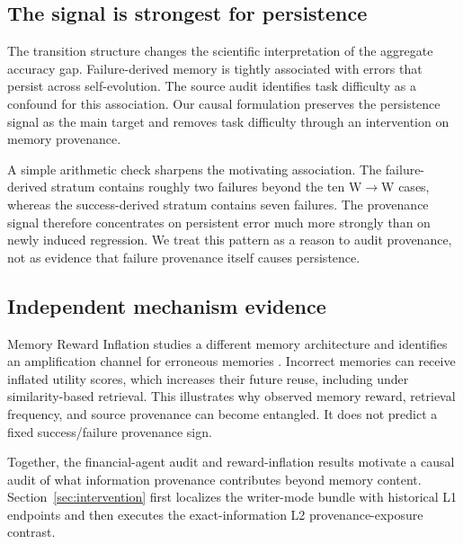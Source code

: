 \subsection{The signal is strongest for persistence}
The transition structure changes the scientific interpretation of the aggregate accuracy gap. Failure-derived memory is tightly associated with errors that persist across self-evolution. The source audit identifies task difficulty as a confound for this association. Our causal formulation preserves the persistence signal as the main target and removes task difficulty through an intervention on memory provenance.

A simple arithmetic check sharpens the motivating association. The failure-derived stratum contains roughly two failures beyond the ten W$\rightarrow$W cases, whereas the success-derived stratum contains seven failures. The provenance signal therefore concentrates on persistent error much more strongly than on newly induced regression. We treat this pattern as a reason to audit provenance, not as evidence that failure provenance itself causes persistence.

\subsection{Independent mechanism evidence}
Memory Reward Inflation studies a different memory architecture and identifies an amplification channel for erroneous memories \citep{asadolahi2026inflation}. Incorrect memories can receive inflated utility scores, which increases their future reuse, including under similarity-based retrieval. This illustrates why observed memory reward, retrieval frequency, and source provenance can become entangled. It does not predict a fixed success/failure provenance sign.

Together, the financial-agent audit and reward-inflation results motivate a causal audit of what information provenance contributes beyond memory content. Section~\ref{sec:intervention} first localizes the writer-mode bundle with historical L1 endpoints and then executes the exact-information L2 provenance-exposure contrast.
